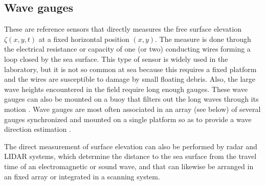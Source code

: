  \subsection{Wave gauges}
 These are reference sensors that directly measures the free surface elevation $\zeta(x,y,t)$ at a fixed horizontal position $(x,y)$. 
 The measure is done through the 
electrical resistance or capacity of one (or two) conducting wires forming a loop closed by the sea surface. This type of sensor is widely 
used in the laboratory, but it is not so common at sea because this requires a fixed  platform
 and the wires are susceptible to damage by small floating debris. Also, the large wave heights encountered in the field require long 
 enough gauges. These wave 
gauges can also be mounted on a buoy that filters out the long waves through its motion \citep{Graber&al.2000}. Wave gauges are most often 
associated in an array (see below) of several gauges synchronized and mounted on a single platform so as to 
provide a wave direction estimation \citep{Cavaleri&al.1981}.

The direct measurement of surface elevation can also be performed by radar and LIDAR systems, which determine the  
distance to the sea surface from the travel time of an electromagnetic or sound wave, and that can likewise be arranged in an fixed array or integrated 
in a scanning system.


